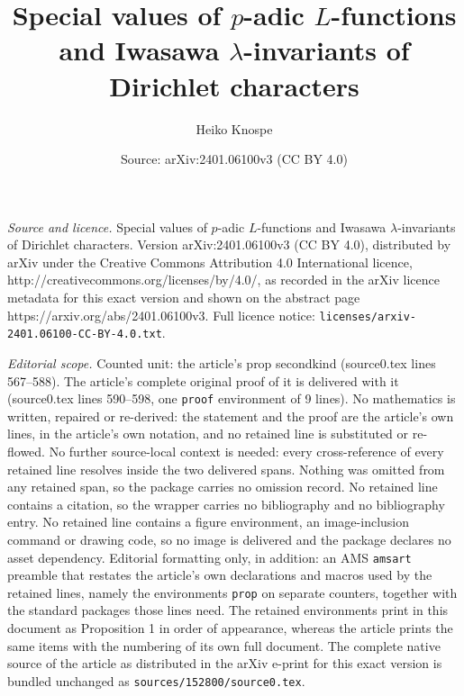 \documentclass[10pt,a4paper]{amsart}
\title{Special values of $p$-adic $L$-functions and Iwasawa $\lambda$-invariants of Dirichlet characters}
\author{Heiko Knospe}
\date{Source: arXiv:2401.06100v3 (CC BY 4.0)}
\begin{document}
\maketitle

\noindent\emph{Source and licence.} Special values of $p$-adic $L$-functions and Iwasawa $\lambda$-invariants of Dirichlet characters. Version arXiv:2401.06100v3 (CC BY 4.0), distributed by arXiv under the Creative Commons Attribution 4.0 International licence, http://creativecommons.org/licenses/by/4.0/, as recorded in the arXiv licence metadata for this exact version and shown on the abstract page https://arxiv.org/abs/2401.06100v3. Full licence notice: \texttt{licenses/arxiv-2401.06100-CC-BY-4.0.txt}.\par\smallskip

\noindent\textit{Editorial scope.} Counted unit: the article's prop secondkind (source0.tex lines 567--588). The article's complete original proof of it is delivered with it (source0.tex lines 590--598, one \texttt{proof} environment of 9 lines). No mathematics is written, repaired or re-derived: the statement and the proof are the article's own lines, in the article's own notation, and no retained line is substituted or re-flowed.  No further source-local context is needed: every cross-reference of every retained line resolves inside the two delivered spans.  Nothing was omitted from any retained span, so the package carries no omission record.  No retained line contains a citation, so the wrapper carries no bibliography and no bibliography entry.  No retained line contains a figure environment, an image-inclusion command or drawing code, so no image is delivered and the package declares no asset dependency.  Editorial formatting only, in addition: an AMS \texttt{amsart} preamble that restates the article's own declarations and macros used by the retained lines, namely the environments \texttt{prop} on separate counters, together with the standard packages those lines need.  The retained environments print in this document as Proposition 1 in order of appearance, whereas the article prints the same items with the numbering of its own full document.  The complete native source of the article as distributed in the arXiv e-print for this exact version is bundled unchanged as \texttt{sources/152800/source0.tex}.
\end{document}
